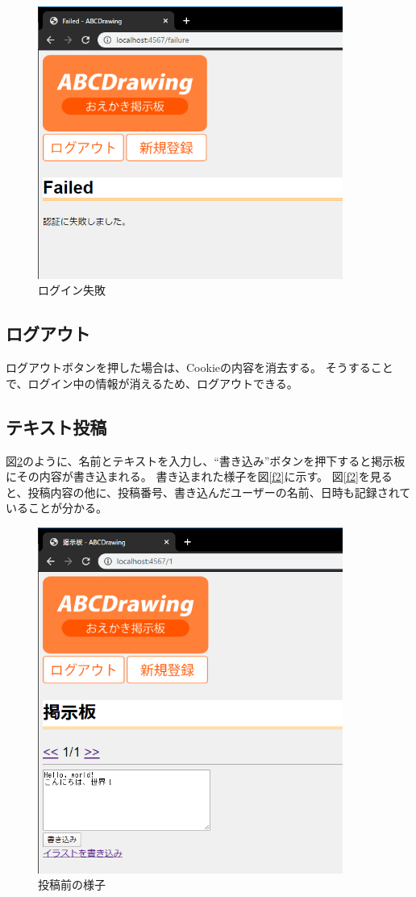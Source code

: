 \documentclass[a4j,titlepage]{jsarticle}
\begin{document}
\begin{figure}[H]
  \centering
  \includegraphics[width=10cm]{failed.png}
  \caption{ログイン失敗}
  \label{failed}
\end{figure}

\subsection{ログアウト}
ログアウトボタンを押した場合は、Cookieの内容を消去する。
そうすることで、ログイン中の情報が消えるため、ログアウトできる。

\subsection{テキスト投稿}
図\ref{f1}のように、名前とテキストを入力し、``書き込み''ボタンを押下すると掲示板にその内容が書き込まれる。
書き込まれた様子を図\ref{f2}に示す。
図\ref{f2}を見ると、投稿内容の他に、投稿番号、書き込んだユーザーの名前、日時も記録されていることが分かる。

\begin{figure}[H]
  \centering
  \includegraphics[width=10cm]{bbs02.png}
  \caption{投稿前の様子}
  \label{f1}
\end{figure}
\end{document}
